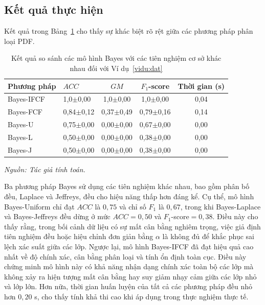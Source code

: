 \documentclass[a4paper,oneside]{book} %
\theoremstyle{plain}
\theoremstyle{plain}
\theoremstyle{nonumberplain}
\begin{document}
\subsection{Kết quả thực hiện}

Kết quả trong Bảng~\ref{tab:bayes_ifcf_results} cho thấy sự khác biệt rõ rệt giữa các phương pháp phân loại PDF.


\begin{table}[H]
	\centering
	\fontsize{11pt}{14pt}\selectfont
	\caption{Kết quả so sánh các mô hình Bayes với các tiên nghiệm cơ sở khác nhau đối với Ví dụ~\ref{vidu:dat}}
	\label{tab:bayes_ifcf_results}
	\begin{tabular*}{\textwidth}{@{\extracolsep\fill}llccc@{\extracolsep\fill}}
		\toprule
		Phương pháp & $ACC$ & $GM$ & $F_1$-score & Thời gian (s) \\ 
		\midrule
		Bayes-IFCF & 1{,}0$\pm$0{,}00 & 1{,}0$\pm$0{,}00 & 1{,}0$\pm$0{,}00 & 0{,}04 \\
		Bayes-FCF  & 0{,}84$\pm$0{,}12 & 0{,}37$\pm$0{,}49 & 0{,}79$\pm$0{,}16 & 0{,}14 \\
		Bayes-U    & 0{,}75$\pm$0{,}00 & 0{,}00$\pm$0{,}00 & 0{,}67$\pm$0{,}00 & 0{,}00 \\
		Bayes-L    & 0{,}50$\pm$0{,}00 & 0{,}00$\pm$0{,}00 & 0{,}38$\pm$0{,}00 & 0{,}00 \\
		Bayes-J    & 0{,}50$\pm$0{,}00 & 0{,}00$\pm$0{,}00 & 0{,}38$\pm$0{,}00 & 0{,}00 \\
		\bottomrule
	\end{tabular*}
	\begin{minipage}{\textwidth}
		\fontsize{11pt}{14pt}\selectfont\it
		Nguồn: Tác giả tính toán.
	\end{minipage}
\end{table}



Ba phương pháp Bayes sử dụng các tiên nghiệm khác nhau, bao gồm phân bố đều, Laplace và Jeffreys, đều cho hiệu năng thấp hơn đáng kể. Cụ thể, mô hình Bayes-Uniform chỉ đạt $ACC$ là $0,75$ và chỉ số $F_1$ là $0{,}67$, trong khi Bayes-Laplace và Bayes-Jeffreys đều dừng ở mức $ACC=0{,}50$ và $F_1$-score$=0{,}38$. Điều này cho thấy rằng, trong bối cảnh dữ liệu có sự mất cân bằng nghiêm trọng, việc giả định tiên nghiệm đều hoặc hiệu chỉnh đơn giản bằng $\alpha$ là không đủ để khắc phục sai lệch xác suất giữa các lớp. Ngược lại, mô hình Bayes-IFCF đã đạt hiệu quả cao nhất về độ chính xác, cân bằng phân loại và tính ổn định toàn cục. Điều này chứng minh mô hình này có khả năng nhận dạng chính xác toàn bộ các lớp mà không xảy ra hiện tượng mất cân bằng hay suy giảm nhạy cảm giữa các lớp nhỏ và lớp lớn.  Hơn nữa, thời gian huấn luyện của tất cả các phương pháp đều nhỏ hơn $0{,}20$ s, cho thấy tính khả thi cao khi áp dụng trong thực nghiệm thực tế.
\end{document}
